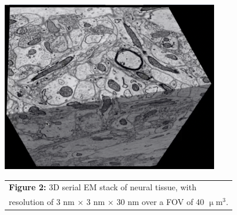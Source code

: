 \documentclass[landscape,a0paper,fontscale=0.36]{baposter} %
\begin{document}
\begin{poster}
{    \begin{center}
      \includegraphics[width=0.37\linewidth]{figs/grant_EM_stack}\\[6pt]
      \begin{tabular}{l}
        \textbf{Figure 2:} 3D serial EM stack of neural tissue,
        with \\resolution of 3 nm $\times$ 3 nm $\times$ 30 nm over a FOV of 40 $\upmu$m$^3$.
        \end{tabular}
    \end{center}
  }

  

\end{poster}
\end{document}
